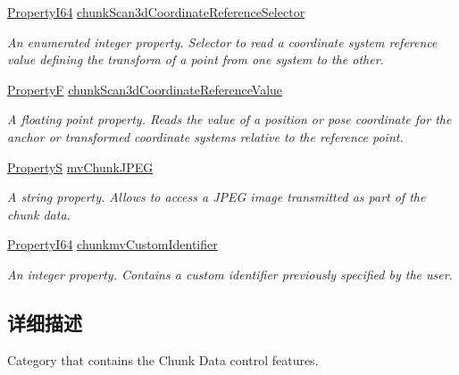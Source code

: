 \begin{DoxyCompactItemize}
\hyperlink{group___common_interface_ga81749b2696755513663492664a18a893}{Property\+I64} \hyperlink{classmv_i_m_p_a_c_t_1_1acquire_1_1_gen_i_cam_1_1_chunk_data_control_aa1f8d5ac6f3f254800f33d0b57bddd18}{chunk\+Scan3d\+Coordinate\+Reference\+Selector}
\begin{DoxyCompactList}\small\item\em An enumerated integer property. Selector to read a coordinate system reference value defining the transform of a point from one system to the other. \end{DoxyCompactList}\item 
\hyperlink{group___common_interface_gaf54865fe5a3d5cfd15f9a111b40d09f9}{Property\+F} \hyperlink{classmv_i_m_p_a_c_t_1_1acquire_1_1_gen_i_cam_1_1_chunk_data_control_aa45a547729c3dac4c8b8b0348c1c1bdd}{chunk\+Scan3d\+Coordinate\+Reference\+Value}
\begin{DoxyCompactList}\small\item\em A floating point property. Reads the value of a position or pose coordinate for the anchor or transformed coordinate systems relative to the reference point. \end{DoxyCompactList}\item 
\hyperlink{classmv_i_m_p_a_c_t_1_1acquire_1_1_property_s}{Property\+S} \hyperlink{classmv_i_m_p_a_c_t_1_1acquire_1_1_gen_i_cam_1_1_chunk_data_control_a78076131ba88ad24c78eb473d10ae3f6}{mv\+Chunk\+J\+P\+E\+G}
\begin{DoxyCompactList}\small\item\em A string property. Allows to access a J\+P\+E\+G image transmitted as part of the chunk data. \end{DoxyCompactList}\item 
\hyperlink{group___common_interface_ga81749b2696755513663492664a18a893}{Property\+I64} \hyperlink{classmv_i_m_p_a_c_t_1_1acquire_1_1_gen_i_cam_1_1_chunk_data_control_a504add88bb062ed69bf85424113cb2a7}{chunkmv\+Custom\+Identifier}
\begin{DoxyCompactList}\small\item\em An integer property. Contains a custom identifier previously specified by the user. \end{DoxyCompactList}\end{DoxyCompactItemize}


\subsection{详细描述}
Category that contains the Chunk Data control features. 

